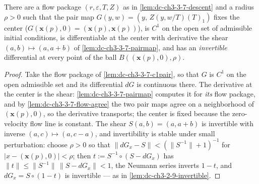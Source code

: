 \begin{lemma}
  \label{lem:dc-ch3-3-7-invertible}
  \leanok
  There are a flow package $(r,\varepsilon,T,Z)$ as in
  \cref{lem:dc-ch3-3-7-descent} and a radius $\rho>0$ such that the pair map
  $G(y,w)=(y,\,Z(y,w/T)(T)_1)$ fixes the center
  ($G(\mathbf{x}(p),0)=(\mathbf{x}(p),\mathbf{x}(p))$), is $C^1$ on the open
  set of admissible initial conditions, is differentiable at the center with
  derivative the shear $(a,b)\mapsto(a,a+b)$ of
  \cref{lem:dc-ch3-3-7-pairmap}, and has an \emph{invertible} differential at
  every point of the ball $B((\mathbf{x}(p),0),\rho)$.
\end{lemma}
\begin{proof}
  \sketch
  \leanok
  Take the flow package of \cref{lem:dc-ch3-3-7-c1pair}, so that $G$ is $C^1$
  on the open admissible set and its differential $dG$ is continuous there.
  The derivative at the center is the shear: \cref{lem:dc-ch3-3-7-pairmap}
  computes it for \emph{its} flow package, and by
  \cref{lem:dc-ch3-3-7-flow-agree} the two pair maps agree on a neighborhood
  of $(\mathbf{x}(p),0)$, so the derivative transports; the center is fixed
  because the zero-velocity flow line is constant. The shear $S(a,b)=(a,a+b)$
  is invertible with inverse $(a,c)\mapsto(a,c-a)$, and invertibility is
  stable under small perturbation: choose $\rho>0$ so that
  $\|dG_x-S\|<(\|S^{-1}\|+1)^{-1}$ for $|x-(\mathbf{x}(p),0)|<\rho$; then
  $t:=S^{-1}\circ(S-dG_x)$ has $\|t\|\le\|S^{-1}\|\,\|S-dG_x\|<1$, the
  Neumann series inverts $1-t$, and $dG_x=S\circ(1-t)$ is invertible — as in
  \cref{lem:dc-ch3-2-9-invertible}.
\end{proof}

